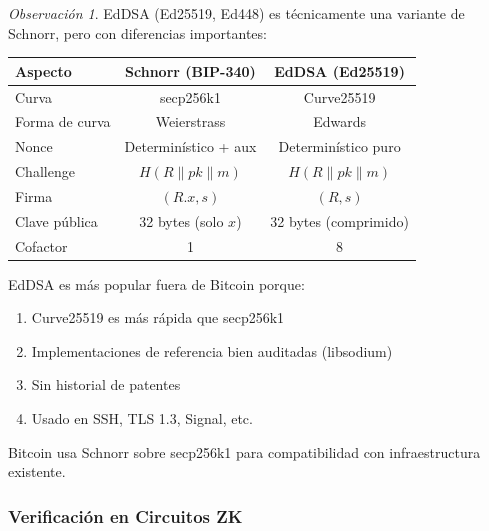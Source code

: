 \documentclass[11pt,a4paper,twoside,openright]{book}
\theoremstyle{definition}
\theoremstyle{plain}
\theoremstyle{remark}
\newtheorem{remark}{Observación}[chapter]
\begin{document}
\begin{remark}
EdDSA (Ed25519, Ed448) es técnicamente una variante de Schnorr, pero con diferencias importantes:

\begin{center}
\begin{tabular}{lcc}
\toprule
\textbf{Aspecto} & \textbf{Schnorr (BIP-340)} & \textbf{EdDSA (Ed25519)} \\
\midrule
Curva & secp256k1 & Curve25519 \\
Forma de curva & Weierstrass & Edwards \\
Nonce & Determinístico + aux & Determinístico puro \\
Challenge & $H(R \| pk \| m)$ & $H(R \| pk \| m)$ \\
Firma & $(R.x, s)$ & $(R, s)$ \\
Clave pública & 32 bytes (solo $x$) & 32 bytes (comprimido) \\
Cofactor & 1 & 8 \\
\bottomrule
\end{tabular}
\end{center}
\end{remark}

\begin{keyidea}
EdDSA es más popular fuera de Bitcoin porque:
\begin{enumerate}
    \item Curve25519 es más rápida que secp256k1
    \item Implementaciones de referencia bien auditadas (libsodium)
    \item Sin historial de patentes
    \item Usado en SSH, TLS 1.3, Signal, etc.
\end{enumerate}

Bitcoin usa Schnorr sobre secp256k1 para compatibilidad con infraestructura existente.
\end{keyidea}

\subsubsection{Verificación en Circuitos ZK}
\end{document}
